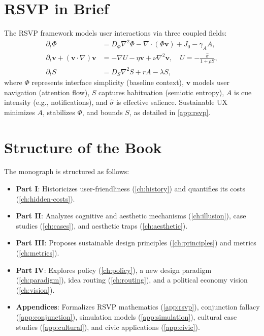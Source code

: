\documentclass[openany]{book}
\newcommand{\PhiS}{\Phi} %
\newcommand{\vvec}{\mathbf{v}} %
\newcommand{\Sent}{S} %
\begin{document}
\section{RSVP in Brief}
\label{sec:intro-rsvp}
The RSVP framework models user interactions via three coupled fields:
\begin{align}
\partial_t \PhiS &= D_\Phi \nabla^2 \PhiS - \nabla \cdot (\PhiS \vvec) + J_0 - \gamma_A A, \label{eq:intro-phi} \\
\partial_t \vvec + (\vvec \cdot \nabla)\vvec &= -\nabla U - \eta \vvec + \nu \nabla^2 \vvec, \quad U = -\frac{\widehat{\sigma}}{1 + \rho \Sent}, \label{eq:intro-v} \\
\partial_t \Sent &= D_S \nabla^2 \Sent + r A - \lambda \Sent, \label{eq:intro-S}
\end{align}
where \(\PhiS\) represents interface simplicity (baseline context), \(\vvec\) models user navigation (attention flow), \(\Sent\) captures habituation (semiotic entropy), \(A\) is cue intensity (e.g., notifications), and \(\widehat{\sigma}\) is effective salience. Sustainable UX minimizes \(A\), stabilizes \(\PhiS\), and bounds \(\Sent\), as detailed in \cref{app:rsvp}.

\section{Structure of the Book}
\label{sec:intro-structure}
The monograph is structured as follows:
\begin{itemize}
  \item \textbf{Part I}: Historicizes user-friendliness (\cref{ch:history}) and quantifies its costs (\cref{ch:hidden-costs}).
  \item \textbf{Part II}: Analyzes cognitive and aesthetic mechanisms (\cref{ch:illusion}), case studies (\cref{ch:cases}), and aesthetic traps (\cref{ch:aesthetic}).
  \item \textbf{Part III}: Proposes sustainable design principles (\cref{ch:principles}) and metrics (\cref{ch:metrics}).
  \item \textbf{Part IV}: Explores policy (\cref{ch:policy}), a new design paradigm (\cref{ch:paradigm}), idea routing (\cref{ch:routing}), and a political economy vision (\cref{ch:vision}).
  \item \textbf{Appendices}: Formalizes RSVP mathematics (\cref{app:rsvp}), conjunction fallacy (\cref{app:conjunction}), simulation models (\cref{app:simulation}), cultural case studies (\cref{app:cultural}), and civic applications (\cref{app:civic}).
\end{itemize}
\end{document}
